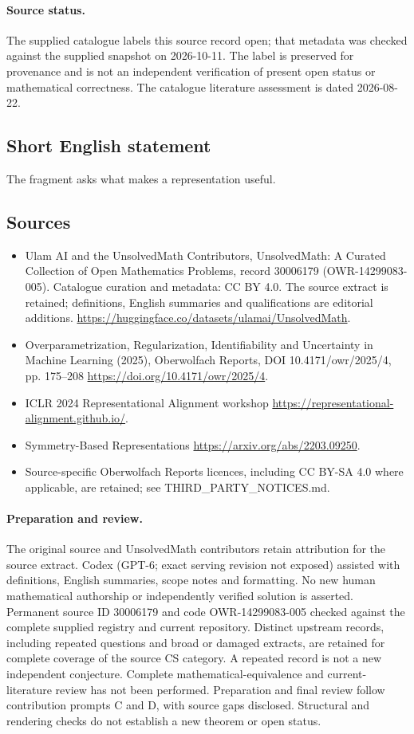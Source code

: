 \documentclass[11pt]{article}
\begin{document}
\paragraph{Source status.}
The supplied catalogue labels this source record open; that metadata was checked against the supplied snapshot on 2026-10-11. The label is preserved for provenance and is not an independent verification of present open status or mathematical correctness. The catalogue literature assessment is dated 2026-08-22.
\subsection{Short English statement}
The fragment asks what makes a representation useful.
\subsection{Sources}
\begin{itemize}
\item[\hypertarget{source:30006179:1}{S1}] Ulam AI and the UnsolvedMath Contributors, UnsolvedMath: A Curated Collection of Open Mathematics Problems, record 30006179 (OWR-14299083-005). Catalogue curation and metadata: CC BY 4.0. The source extract is retained; definitions, English summaries and qualifications are editorial additions.
\url{https://huggingface.co/datasets/ulamai/UnsolvedMath}.
\item[\hypertarget{source:30006179:2}{S2}] Overparametrization, Regularization, Identifiability and Uncertainty in Machine Learning (2025), Oberwolfach Reports, DOI 10.4171/owr/2025/4, pp. 175--208
\url{https://doi.org/10.4171/owr/2025/4}.
\item[\hypertarget{source:30006179:3}{S3}] ICLR 2024 Representational Alignment workshop
\url{https://representational-alignment.github.io/}.
\item[\hypertarget{source:30006179:4}{S4}] Symmetry-Based Representations
\url{https://arxiv.org/abs/2203.09250}.
\item Source-specific Oberwolfach Reports licences, including CC BY-SA 4.0 where applicable, are retained; see THIRD\_PARTY\_NOTICES.md.
\end{itemize}
\paragraph{Preparation and review.}
The original source and UnsolvedMath contributors retain attribution for the source extract. Codex (GPT-6; exact serving revision not exposed) assisted with definitions, English summaries, scope notes and formatting. No new human mathematical authorship or independently verified solution is asserted. Permanent source ID 30006179 and code OWR-14299083-005 checked against the complete supplied registry and current repository. Distinct upstream records, including repeated questions and broad or damaged extracts, are retained for complete coverage of the source CS category. A repeated record is not a new independent conjecture. Complete mathematical-equivalence and current-literature review has not been performed. Preparation and final review follow contribution prompts C and D, with source gaps disclosed. Structural and rendering checks do not establish a new theorem or open status.
\label{end:30006179}
\end{document}
